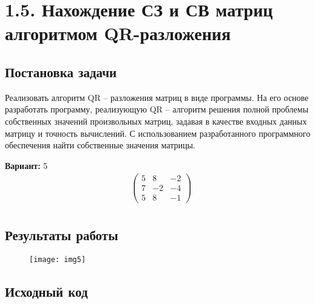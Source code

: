 \section* {1.5. Нахождение СЗ и СВ матриц алгоритмом QR-разложения}

\setcounter{subsection}{0}

\subsection{Постановка задачи}
Реализовать алгоритм QR – разложения матриц в виде программы. На его основе разработать программу, реализующую QR – алгоритм решения полной проблемы собственных значений произвольных матриц, задавая в качестве входных данных матрицу и точность вычислений. С использованием разработанного программного обеспечения найти собственные значения матрицы.    

{\bfseries Вариант:} 5
\begin{align*}
& \begin{pmatrix}
5 & 8 & -2 \\
7 & -2 & -4 \\
5 & 8 & -1
\end{pmatrix} \\
\end{align*}

\subsection{Результаты работы}
\begin{figure}[h!]
\raggedright
\texttt{[image: img5]}
\end{figure}
\pagebreak

\subsection{Исходный код}

\pagebreak